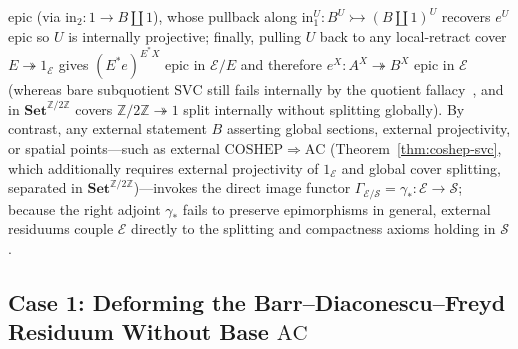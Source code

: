 \documentclass[10pt,twoside,openright]{book}
\theoremstyle{crmplain}
\theoremstyle{crmdef}
\theoremstyle{crmremark}
\begin{document}
epic (via $\mathrm{in}_2 : 1 \to B \amalg 1$), whose pullback along $\mathrm{in}_1^U : B^U \rightarrowtail (B \amalg 1)^U$ recovers $e^U$ epic so $U$ is internally projective; finally, pulling $U$ back to any local-retract cover $E \twoheadrightarrow 1_{\mathcal{E}}$ gives $(E^* e)^{E^* X}$ epic in $\mathcal{E}/E$ and therefore $e^X : A^X \twoheadrightarrow B^X$ epic in $\mathcal{E}$ (whereas bare subquotient $\mathrm{SVC}$ still fails internally by the quotient fallacy~\cite{Blass79}, and in $\mathbf{Set}^{\mathbb{Z}/2\mathbb{Z}}$ covers $\mathbb{Z}/2\mathbb{Z} \twoheadrightarrow 1$ split internally without splitting globally). By contrast, any external statement $B$ asserting global sections, external projectivity, or spatial points---such as external $\mathrm{COSHEP} \Rightarrow \mathrm{AC}$ (Theorem~\ref{thm:coshep-svc}, which additionally requires external projectivity of $1_{\mathcal{E}}$ and global cover splitting, separated in $\mathbf{Set}^{\mathbb{Z}/2\mathbb{Z}}$)---invokes the direct image functor $\Gamma_{\mathcal{E}/\mathcal{S}} = \gamma_* : \mathcal{E} \to \mathcal{S}$; because the right adjoint $\gamma_*$ fails to preserve epimorphisms in general, external residuums couple $\mathcal{E}$ directly to the splitting and compactness axioms holding in $\mathcal{S}$.

\subsection{\texorpdfstring{Case 1: Deforming the Barr--Diaconescu--Freyd Residuum Without Base $\mathrm{AC}$}{Case 1: Deforming the Barr--Diaconescu--Freyd Residuum Without Base AC}}
\end{document}
